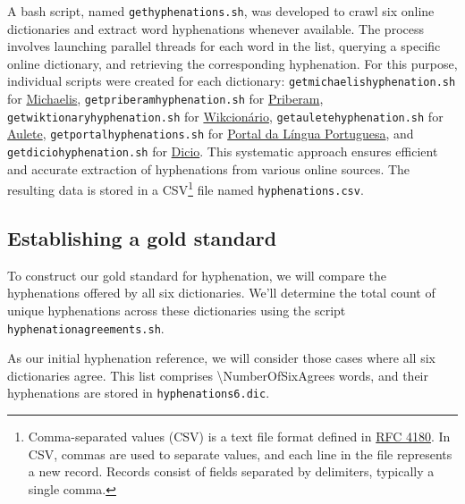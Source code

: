 \documentclass{article}
\begin{document}
A bash script, named \texttt{gethyphenations.sh}, was developed to crawl six
online dictionaries and extract word hyphenations whenever available. The
process involves launching parallel threads for each word in the list, querying
a specific online dictionary, and retrieving the corresponding hyphenation. For
this purpose, individual scripts were created for each dictionary:
\texttt{getmichaelishyphenation.sh} for \href{https://michaelis.uol.com.br/}{Michaelis},
\texttt{getpriberamhyphenation.sh} for \href{https://dicionario.priberam.org/}{Priberam},
\texttt{getwiktionaryhyphenation.sh} for \href{https://pt.wiktionary.org}{Wikcionário},
\texttt{getauletehyphenation.sh} for \href{https://aulete.com.br/}{Aulete},
\texttt{getportalhyphenations.sh} for \href{http://www.portaldalinguaportuguesa.org/}{Portal da Língua Portuguesa}, and
\texttt{getdiciohyphenation.sh} for \href{https://www.dicio.com.br/}{Dicio}.
This systematic approach ensures efficient and accurate extraction of
hyphenations from various online sources. The resulting data is stored in a CSV\footnote{
    Comma-separated values (CSV) is a text file format defined in \href{https://datatracker.ietf.org/doc/html/rfc4180}{RFC 4180}.
    In CSV, commas are used to separate values, and each line in the file represents a new record. Records consist of fields separated by delimiters, typically a single comma.
} file named \texttt{hyphenations.csv}.






\subsection{Establishing a gold standard}

To construct our gold standard for hyphenation, we will compare the
hyphenations offered by all six dictionaries. We'll determine the total count
of unique hyphenations across these dictionaries using the script
\texttt{hyphenationagreements.sh}.

As our initial hyphenation reference, we will consider those cases where all
six dictionaries agree. This list comprises \num{\NumberOfSixAgrees} words,
and their hyphenations are stored in \texttt{hyphenations6.dic}.
\end{document}
